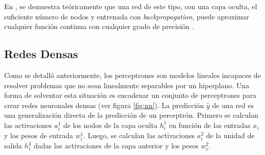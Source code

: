 En \citeyear{funahashi1989approximate}, se demuestra teóricamente que una red de este tipo, con una capa oculta, el
suficiente número de nodos y entrenada con {\it backpropagation}, puede aproximar cualquier función continua con
cualquier grado de precisión \parencite{funahashi1989approximate}.

\subsection{Redes Densas}
Como se detalló anteriormente, los perceptrones son modelos lineales incapaces de resolver problemas que no sean
linealmente separables por un hiperplano. Una forma de solventar esta situación es encadenar un conjunto de
perceptrones para crear redes neuronales densas (ver figura \ref{fig:nn}). La predicción $\hat{y}$ de una red es una
generalización directa de la predicción de un perceptrón. Primero se calculan las activaciones $a_i^1$ de los nodos de
la capa oculta $h_i^1$ en función de las entradas $x_i$ y los pesos de entrada $w_i^1$. Luego, se calculan las
activaciones $a_i^2$ de la unidad de salida $h_1^2$ dadas las activaciones de la capa anterior y los pesos $w_i^2$.

